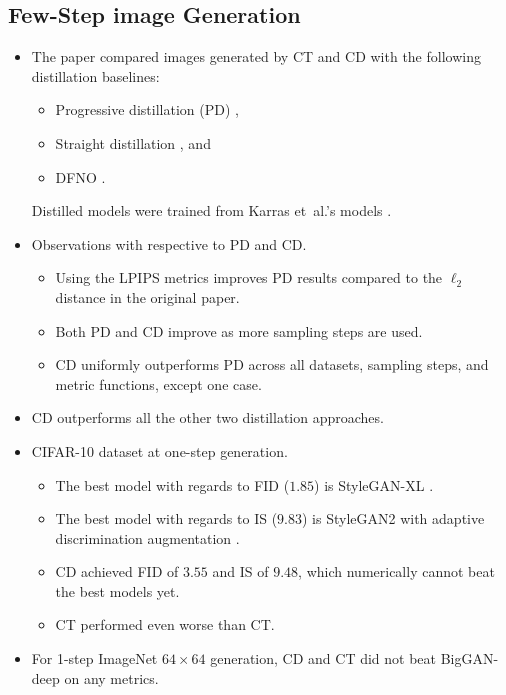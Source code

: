 \documentclass[10pt]{article}
\newcommand{\etal}{{et~al.}}
\begin{document}
\subsection{Few-Step image Generation}

\begin{itemize}
  \item The paper compared images generated by CT and CD with the following distillation baselines:
  \begin{itemize}
    \item Progressive distillation (PD) \cite{Salimans:2022},
    \item Straight distillation \cite{Luhman:2021}, and
    \item DFNO \cite{Zhang:2022}.
  \end{itemize}
  Distilled models were trained from Karras \etal's models \cite{Karras:2022}.

  \item Observations with respective to PD and CD.
  \begin{itemize}
    \item Using the LPIPS metrics improves PD results compared to the $\ell_2$ distance in the original paper.
    \item Both PD and CD improve as more sampling steps are used.
    \item CD uniformly outperforms PD across all datasets, sampling steps, and metric functions, except one case.
  \end{itemize}

  \item CD outperforms all the other two distillation approaches.
  
  \item CIFAR-10 dataset at one-step generation.
  \begin{itemize}
    \item The best model with regards to FID ($1.85$) is StyleGAN-XL \cite{Sauer:2022}.
    \item The best model with regards to IS ($9.83$) is StyleGAN2 with adaptive discrimination augmentation \cite{Karras:2019, Karras:2020}. 
    \item CD achieved FID of $3.55$ and IS of $9.48$, which numerically cannot beat the best models yet.
    \item CT performed even worse than CT.
  \end{itemize}

  \item For 1-step ImageNet $64 \times 64$ generation, CD and CT did not beat BigGAN-deep \cite{Brock:2018} on any metrics.
  

\end{itemize}
\end{document}
